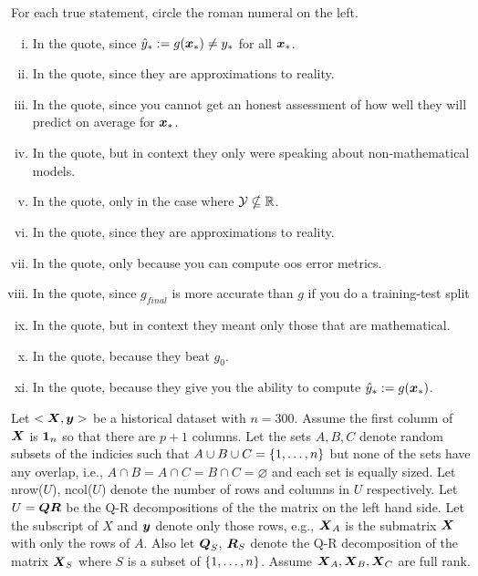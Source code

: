 \documentclass[12pt]{article}
\begin{document}
\begin{enumerate}[(a)]
\vspace{-0.3cm}
 For each true statement, circle the roman numeral on the left. 

\begin{enumerate}[(i)]
\item \iftoggle{solutions}{\inred{TRUE}}{} In the quote,  since $\hat{y}_* := g(\boldsymbol{x}_*) \neq y_*$ for all $\boldsymbol{x}_*$.
\item \iftoggle{solutions}{\inred{TRUE}}{} In the quote,  since they are approximations to reality.
\item In the quote,  since you cannot get an honest assessment of how well they will predict on average for $\boldsymbol{x}_*$.
\item In the quote,  but in context they only were speaking about non-mathematical models.
\item In the quote,  only in the case where $\mathcal{Y} \nsubseteq \mathbb{R}$.
\item \iftoggle{solutions}{\inred{TRUE}}{} In the quote,  since they are approximations to reality.
\item In the quote,  only because you can compute oos error metrics.
\item In the quote,  since $g_{final}$ is more accurate than $g$ if you do a training-test split
\item In the quote,  but in context they meant only those that are mathematical.
\item \iftoggle{solutions}{\inred{TRUE}}{} In the quote,  because they beat $g_0$.
\item In the quote,  because they give you the ability to compute $\hat{y}_* := g(\boldsymbol{x}_*)$.
\end{enumerate}
\end{enumerate}


\problem  Let $<\boldsymbol{X}, \boldsymbol{y}>$ be a historical dataset with $n = 300$. Assume the first column of $\boldsymbol{X}$ is $\boldsymbol{1}_n$ so that there are $p+1$ columns. Let the sets $A,B,C$ denote random subsets of the indicies such that $A \cup B \cup C = \left\{1, \ldots, n\right\}$ but none of the sets have any overlap, i.e., $A \cap B = A \cap C = B \cap C = \varnothing$ and each set is equally sized. Let nrow($U$), ncol($U$) denote the number of rows and columns in $U$ respectively. Let $U = \boldsymbol{Q}\boldsymbol{R}$ be the Q-R decompositions of the the matrix on the left hand side. Let the subscript of $X$ and $\boldsymbol{y}$ denote only those rows, e.g., $\boldsymbol{X}_A$ is the submatrix $\boldsymbol{X}$ with only the rows of $A$.  Also let $\boldsymbol{Q}_S$, $\boldsymbol{R}_S$ denote the Q-R decomposition of the matrix $\boldsymbol{X}_S$ where $S$ is a subset of $\left\{1, \ldots, n\right\}$. Assume $\boldsymbol{X}_A, \boldsymbol{X}_B, \boldsymbol{X}_C$ are full rank. 
\end{document}
